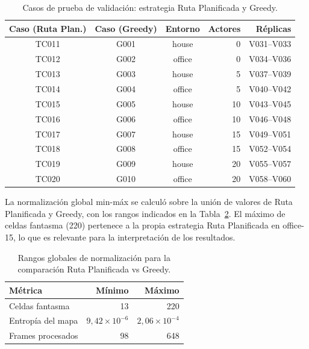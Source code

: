 \begin{table}[htbp]
    \centering
    \caption{Casos de prueba de validación: estrategia Ruta Planificada y Greedy.}%
    \label{tab:casos_ruta}
    \begin{tabular}{cccrr}
        \toprule
        \textbf{Caso (Ruta Plan.)} & \textbf{Caso (Greedy)} & \textbf{Entorno} & \textbf{Actores} & \textbf{Réplicas} \\
        \midrule
        TC011 & G001 & house  &  0 & V031–V033 \\
        TC012 & G002 & office &  0 & V034–V036 \\
        TC013 & G003 & house  &  5 & V037–V039 \\
        TC014 & G004 & office &  5 & V040–V042 \\
        TC015 & G005 & house  & 10 & V043–V045 \\
        TC016 & G006 & office & 10 & V046–V048 \\
        TC017 & G007 & house  & 15 & V049–V051 \\
        TC018 & G008 & office & 15 & V052–V054 \\
        TC019 & G009 & house  & 20 & V055–V057 \\
        TC020 & G010 & office & 20 & V058–V060 \\
        \bottomrule
    \end{tabular}
\end{table}

La normalización global min-máx se calculó sobre la unión de valores de Ruta Planificada y Greedy, con los rangos indicados en la Tabla~\ref{tab:rangos_globales_e2}. El máximo de celdas fantasma (220) pertenece a la propia estrategia Ruta Planificada en office-15, lo que es relevante para la interpretación de los resultados.

\begin{table}[htbp]
    \centering
    \caption{Rangos globales de normalización para la comparación Ruta Planificada vs Greedy.}%
    \label{tab:rangos_globales_e2}
    \begin{tabular}{lrr}
        \toprule
        \textbf{Métrica} & \textbf{Mínimo} & \textbf{Máximo} \\
        \midrule
        Celdas fantasma & 13 & 220 \\
        Entropía del mapa & $9{,}42 \times 10^{-6}$ & $2{,}06 \times 10^{-4}$ \\
        Frames procesados & 98 & 648 \\
        \bottomrule
    \end{tabular}
\end{table}

